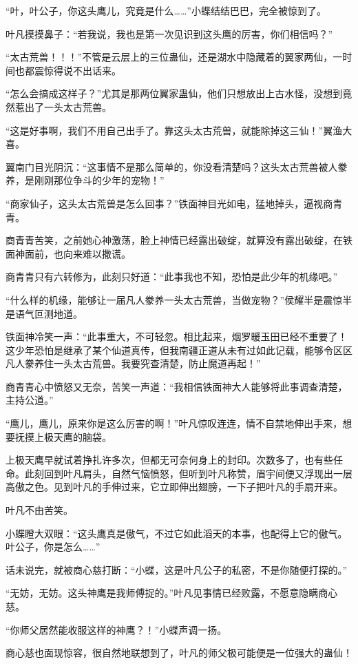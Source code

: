 \begin{this_body}
“叶，叶公子，你这头鹰儿，究竟是什么……”小蝶结结巴巴，完全被惊到了。

叶凡摸摸鼻子：“若我说，我也是第一次见识到这头鹰的厉害，你们相信吗？”

“太古荒兽！！！”不管是云层上的三位蛊仙，还是湖水中隐藏着的翼家两仙，一时间也都震惊得说不出话来。

“怎么会搞成这样子？”尤其是那两位翼家蛊仙，他们只想放出上古水怪，没想到竟然惹出了一头太古荒兽。

“这是好事啊，我们不用自己出手了。靠这头太古荒兽，就能除掉这三仙！”翼渔大喜。

翼南门目光阴沉：“这事情不是那么简单的，你没看清楚吗？这头太古荒兽被人豢养，是刚刚那位争斗的少年的宠物！”

“商家仙子，这头太古荒兽是怎么回事？”铁面神目光如电，猛地掉头，逼视商青青。

商青青苦笑，之前她心神激荡，脸上神情已经露出破绽，就算没有露出破绽，在铁面神面前，也向来难以撒谎。

商青青只有六转修为，此刻只好道：“此事我也不知，恐怕是此少年的机缘吧。”

“什么样的机缘，能够让一届凡人豢养一头太古荒兽，当做宠物？”侯耀半是震惊半是语气叵测地道。

铁面神冷笑一声：“此事重大，不可轻忽。相比起来，烟罗暖玉田已经不重要了！这少年恐怕是继承了某个仙道真传，但我南疆正道从未有过如此记载，能够令区区凡人豢养住一头太古荒兽。我要究查清楚，防止魔道再起！”

商青青心中愤怒又无奈，苦笑一声道：“我相信铁面神大人能够将此事调查清楚，主持公道。”

“鹰儿，鹰儿，原来你是这么厉害的啊！”叶凡惊叹连连，情不自禁地伸出手来，想要抚摸上极天鹰的脑袋。

上极天鹰早就试着挣扎许多次，但都无可奈何身上的封印。次数多了，也有些任命。此刻回到叶凡肩头，自然气恼愤怒，但听到叶凡称赞，眉宇间便又浮现出一层高傲之色。见到叶凡的手伸过来，它立即伸出翅膀，一下子把叶凡的手扇开来。

叶凡不由苦笑。

小蝶瞪大双眼：“这头鹰真是傲气，不过它如此滔天的本事，也配得上它的傲气。叶公子，你是怎么……”

话未说完，就被商心慈打断：“小蝶，这是叶凡公子的私密，不是你随便打探的。”

“无妨，无妨。这头神鹰是我师傅捉的。”叶凡见事情已经败露，不愿意隐瞒商心慈。

“你师父居然能收服这样的神鹰？！”小蝶声调一扬。

商心慈也面现惊容，很自然地联想到了，叶凡的师父极可能便是一位强大的蛊仙！


\end{this_body}
